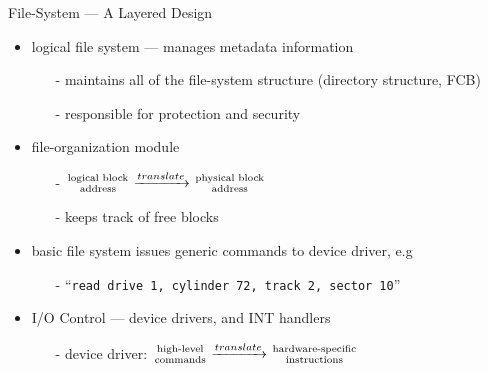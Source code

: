 \begin{frame}{File-System --- A Layered Design}
  \begin{minipage}{.2\textwidth}
  \end{minipage}\hfill
  \begin{minipage}{.75\textwidth}
    \begin{itemize}
    \item \alert{logical file system} --- manages metadata information
      \begin{itemize}
      \item[-] maintains all of the file-system structure (directory structure, FCB)
      \item[-] responsible for protection and security
      \end{itemize}
    \item \alert{file-organization module}
      \begin{itemize}
      \item[-] $\genfrac{}{}{0pt}{}{\text{logical block}}{\text{address}}
        \xrightarrow{translate} \genfrac{}{}{0pt}{}{\text{physical
            block}}{\text{address}}$
      \item[-] keeps track of free blocks
      \end{itemize}
    \item \alert{basic file system} issues generic commands to device driver,
      e.g
      \begin{itemize}
      \item[-] ``\texttt{read drive 1, cylinder 72, track 2, sector 10}''
      \end{itemize}
    \item \alert{I/O Control} --- device drivers, and INT handlers
      \begin{itemize}
      \item[-] \alert{device driver:}
        $\genfrac{}{}{0pt}{}{\text{high-level}}{\text{commands}} \xrightarrow{translate}
        \genfrac{}{}{0pt}{}{\text{hardware-specific}}{\text{instructions}}$
      \end{itemize}
    \end{itemize}
  \end{minipage}
\end{frame}

